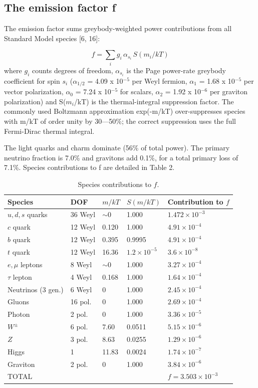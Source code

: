 \documentclass[12pt,a4paper]{article}
\begin{document}
\subsection{The emission factor f}
The emission factor sums greybody-weighted power contributions from all Standard Model species [6, 16]:

\begin{equation}
f = \sum_i g_i \, \alpha_{s_i} \, S(m_i/kT)
\end{equation}
where $g_i$ counts degrees of freedom, $\alpha_{s_i}$ is the Page power-rate greybody coefficient for spin $s_i$ ($\alpha_{1/2}$ = 4.09 x 10$^{-5}$ per Weyl fermion, $\alpha_1$ = 1.68 x 10$^{-5}$ per vector polarization, $\alpha_0$ = 7.24 x 10$^{-5}$ for scalars, $\alpha_2$ = 1.92 x 10$^{-6}$ per graviton polarization) and S($m_i$/kT) is the thermal-integral suppression factor. The commonly used Boltzmann approximation exp(-m/kT) over-suppresses species with m/kT of order unity by 30---50\%; the correct suppression uses the full Fermi-Dirac thermal integral.

The light quarks and charm dominate (56\% of total power). The primary neutrino fraction is 7.0\% and gravitons add 0.1\%, for a total primary loss of 7.1\%. Species contributions to f are detailed in Table 2.


\begin{table}[h]
\centering
\caption{Species contributions to $f$.}
\label{tab:species}
\small
\begin{tabular}{lllll}
\hline
\textbf{Species} & \textbf{DOF} & \textbf{$m/kT$} & \textbf{$S(m/kT)$} & \textbf{Contribution to $f$} \\
\hline
$u, d, s$ quarks & 36 Weyl & $\sim$0 & 1.000 & $1.472 \times 10^{-3}$ \\
$c$ quark & 12 Weyl & 0.120 & 1.000 & $4.91 \times 10^{-4}$ \\
$b$ quark & 12 Weyl & 0.395 & 0.9995 & $4.91 \times 10^{-4}$ \\
$t$ quark & 12 Weyl & 16.36 & $1.2 \times 10^{-5}$ & $3.6 \times 10^{-8}$ \\
$e, \mu$ leptons & 8 Weyl & $\sim$0 & 1.000 & $3.27 \times 10^{-4}$ \\
$\tau$ lepton & 4 Weyl & 0.168 & 1.000 & $1.64 \times 10^{-4}$ \\
Neutrinos (3 gen.) & 6 Weyl & 0 & 1.000 & $2.45 \times 10^{-4}$ \\
Gluons & 16 pol. & 0 & 1.000 & $2.69 \times 10^{-4}$ \\
Photon & 2 pol. & 0 & 1.000 & $3.36 \times 10^{-5}$ \\
$W^{\pm}$ & 6 pol. & 7.60 & 0.0511 & $5.15 \times 10^{-6}$ \\
$Z$ & 3 pol. & 8.63 & 0.0255 & $1.29 \times 10^{-6}$ \\
Higgs & 1 & 11.83 & 0.0024 & $1.74 \times 10^{-7}$ \\
Graviton & 2 pol. & 0 & 1.000 & $3.84 \times 10^{-6}$ \\
\hline
TOTAL & & & & $f = 3.503 \times 10^{-3}$ \\
\hline
\end{tabular}
\end{table}
\end{document}
